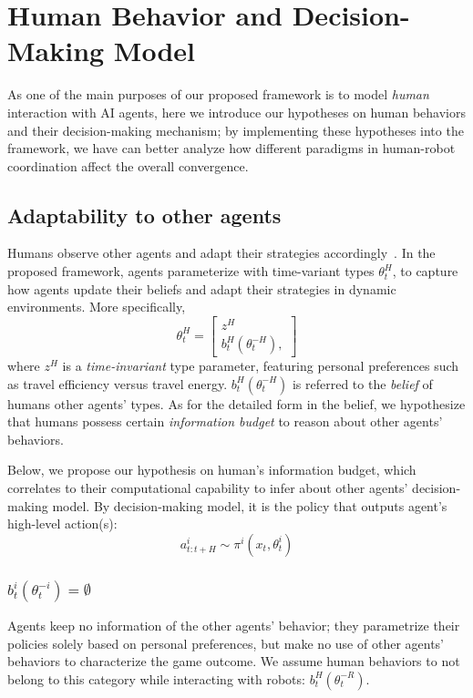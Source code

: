 \documentclass[letterpaper, 10 pt, conference]{ieeeconf}  %
\begin{document}
\section{Human Behavior and Decision-Making Model}\label{sec:human_behavior}
As one of the main purposes of our proposed framework is to model \textit{human} 
interaction with AI agents, here we introduce our hypotheses on human 
behaviors and their decision-making mechanism; by implementing these hypotheses 
into the framework, we have can better analyze how different paradigms in 
human-robot coordination affect the overall convergence.

\subsection{Adaptability to other agents}\label{sec:adaptability}
Humans observe other agents and adapt their strategies 
accordingly~\cite{nikolaidis2016formalizing,yang2017evaluating}. In the 
proposed framework, 
agents parameterize with time-variant types 
$\theta^H_t$, to capture how agents update their beliefs and adapt their 
strategies in dynamic environments. More specifically,
\begin{equation}
  \theta^H_t = \begin{bmatrix}
    z^H \\
    b^H_t(\theta^{-H}_t),
  \end{bmatrix}
\end{equation}
  where $z^H$ is a \textit{time-invariant} type parameter, featuring personal 
  preferences such as travel efficiency versus travel energy. 
  $b^H_t(\theta^{-H}_t)$ is referred to the \textit{belief} of humans other 
  agents' types. As for the detailed form in the belief, we hypothesize that 
  humans possess certain \textit{information budget} to reason about other agents' behaviors.

 Below, we propose our hypothesis on human's information budget, which 
 correlates to their computational capability to infer about other agents' 
 decision-making model. By decision-making model, it is the policy that outputs agent's high-level action(s):
 \begin{equation}
   a^i_{t:t+H} \sim \pi^i(x_t,\theta^i_t)
 \end{equation}
\subsubsection{$b^i_t(\theta^{-i}_t) = \emptyset$} 
Agents keep no information of the 
other agents' behavior; they parametrize their policies solely based on personal 
preferences, but make no use of other agents' behaviors to characterize the 
game outcome. We assume human behaviors to not belong to this 
category while interacting with robots: $b^H_t(\theta^{-R}_t)$.
\end{document}
